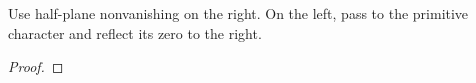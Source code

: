 \begin{theorem}
\label{strip}
\leanok
Use half-plane nonvanishing on the right. On the left, pass to the primitive character and reflect its zero to the right.
\end{theorem}
\begin{proof}
\leanok
\end{proof}
